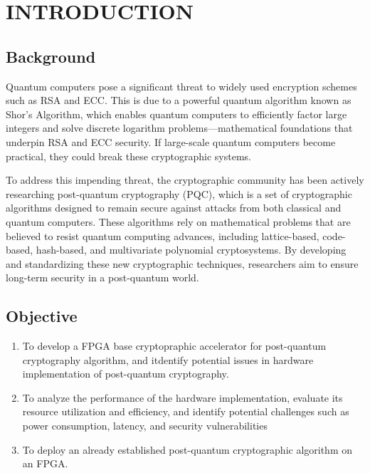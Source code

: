 \chapter{INTRODUCTION}

\section{Background}
Quantum computers pose a significant threat to widely used encryption schemes such as RSA and ECC. This is due to a powerful quantum algorithm known as Shor’s Algorithm, which enables quantum computers to efficiently factor large integers and solve discrete logarithm problems—mathematical foundations that underpin RSA and ECC security. If large-scale quantum computers become practical, they could break these cryptographic systems.

To address this impending threat, the cryptographic community has been actively researching post-quantum cryptography (PQC), which is a set of cryptographic algorithms designed to remain secure against attacks from both classical and quantum computers. These algorithms rely on mathematical problems that are believed to resist quantum computing advances, including lattice-based, code-based, hash-based, and multivariate polynomial cryptosystems. By developing and standardizing these new cryptographic techniques, researchers aim to ensure long-term security in a post-quantum world.

\section{Objective}
\noindent\hspace{1.5em}
\begin{enumerate}
	\item To develop a FPGA base cryptopraphic accelerator for post-quantum cryptography algorithm, and itdentify potential issues in hardware implementation of post-quantum cryptography.
	\item To analyze the performance of the hardware implementation, evaluate its resource utilization and efficiency, and identify potential challenges such as power consumption, latency, and security vulnerabilities
	 \item To deploy an already established post-quantum cryptographic algorithm on an FPGA.
\end{enumerate}

